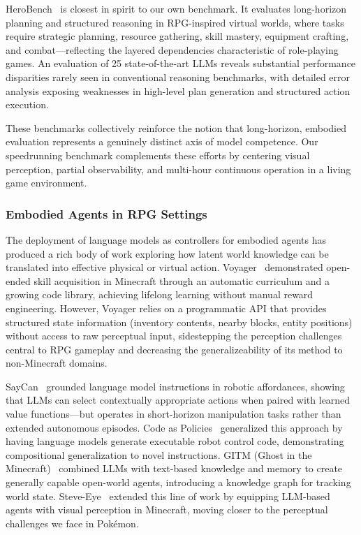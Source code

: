 HeroBench~\citep{anokhin2025herobench} is closest in spirit to our own benchmark. It evaluates long-horizon planning and structured reasoning in RPG-inspired virtual worlds, where tasks require strategic planning, resource gathering, skill mastery, equipment crafting, and combat---reflecting the layered dependencies characteristic of role-playing games. An evaluation of 25 state-of-the-art LLMs reveals substantial performance disparities rarely seen in conventional reasoning benchmarks, with detailed error analysis exposing weaknesses in high-level plan generation and structured action execution.

These benchmarks collectively reinforce the notion that long-horizon, embodied evaluation represents a genuinely distinct axis of model competence. Our speedrunning benchmark complements these efforts by centering visual perception, partial observability, and multi-hour continuous operation in a living game environment.

\subsubsection{Embodied Agents in RPG Settings}\label{sec:embodied_agents}

The deployment of language models as controllers for embodied agents has produced a rich body of work exploring how latent world knowledge can be translated into effective physical or virtual action. Voyager~\citep{wang2023voyager} demonstrated open-ended skill acquisition in Minecraft through an automatic curriculum and a growing code library, achieving lifelong learning without manual reward engineering. However, Voyager relies on a programmatic API that provides structured state information (inventory contents, nearby blocks, entity positions) without access to  raw perceptual input, sidestepping the perception challenges central to RPG gameplay and decreasing the generalizeability of its method to non-Minecraft domains.

SayCan~\citep{brohan2023can} grounded language model instructions in robotic affordances, showing that LLMs can select contextually appropriate actions when paired with learned value functions---but operates in short-horizon manipulation tasks rather than extended autonomous episodes. Code as Policies~\citep{liang2023code} generalized this approach by having language models generate executable robot control code, demonstrating compositional generalization to novel instructions. GITM (Ghost in the Minecraft)~\citep{zhu2023ghost} combined LLMs with text-based knowledge and memory to create generally capable open-world agents, introducing a knowledge graph for tracking world state. Steve-Eye~\citep{zheng2024steveeye} extended this line of work by equipping LLM-based agents with visual perception in Minecraft, moving closer to the perceptual challenges we face in Pok\'{e}mon.

